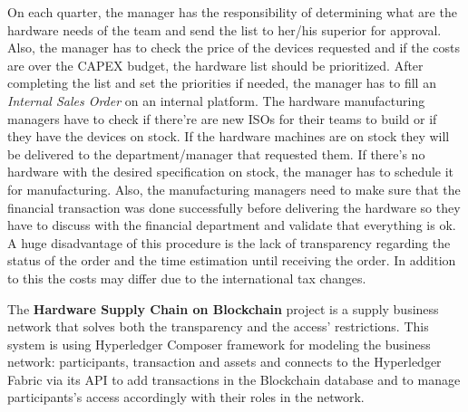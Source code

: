 On each quarter, the manager has the responsibility of determining what are the hardware needs of the team and send the list to her/his superior for approval.
Also, the manager has to check the price of the devices requested and if the costs are over the CAPEX budget, the hardware list should be prioritized. 
After completing the list and set the priorities if needed, the manager has to fill an \emph{Internal Sales Order} on an internal platform. 
The hardware manufacturing managers have to check if there're are new ISOs for their teams to build or if they have the devices on stock. If the hardware machines are on stock they will be delivered to the department/manager that requested them. If there's no hardware with the desired specification on stock, the manager has to schedule it for manufacturing.
Also, the manufacturing managers need to make sure that the financial transaction was done successfully before delivering the hardware so they have to discuss with the financial department and validate that everything is ok.
A huge disadvantage of this procedure is the lack of transparency regarding the status of the order and the time estimation until receiving the order.
In addition to this the costs may differ due to the international tax changes. 

The \textbf{Hardware Supply Chain on Blockchain} project is a supply business network that solves both the transparency and the access' restrictions.
This system is using Hyperledger Composer framework for modeling the business network: participants, transaction and assets and connects to the Hyperledger Fabric via its API to add transactions in the Blockchain database and to manage participants's access accordingly with their roles in the network.
















